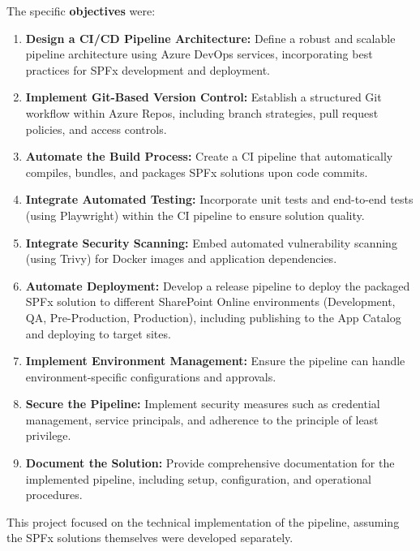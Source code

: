 The specific \textbf{objectives} were:
\begin{enumerate}
    \item \textbf{Design a CI/CD Pipeline Architecture:} Define a robust and scalable pipeline architecture using Azure DevOps services, incorporating best practices for SPFx development and deployment.
    \item \textbf{Implement Git-Based Version Control:} Establish a structured Git workflow within Azure Repos, including branch strategies, pull request policies, and access controls.
    \item \textbf{Automate the Build Process:} Create a CI pipeline that automatically compiles, bundles, and packages SPFx solutions upon code commits.
    \item \textbf{Integrate Automated Testing:} Incorporate unit tests and end-to-end tests (using Playwright) within the CI pipeline to ensure solution quality.
    \item \textbf{Integrate Security Scanning:} Embed automated vulnerability scanning (using Trivy) for Docker images and application dependencies.
    \item \textbf{Automate Deployment:} Develop a release pipeline to deploy the packaged SPFx solution to different SharePoint Online environments (Development, QA, Pre-Production, Production), including publishing to the App Catalog and deploying to target sites.
    \item \textbf{Implement Environment Management:} Ensure the pipeline can handle environment-specific configurations and approvals.
    \item \textbf{Secure the Pipeline:} Implement security measures such as credential management, service principals, and adherence to the principle of least privilege.
    \item \textbf{Document the Solution:} Provide comprehensive documentation for the implemented pipeline, including setup, configuration, and operational procedures.
\end{enumerate}

This project focused on the technical implementation of the pipeline, assuming the SPFx solutions themselves were developed separately.